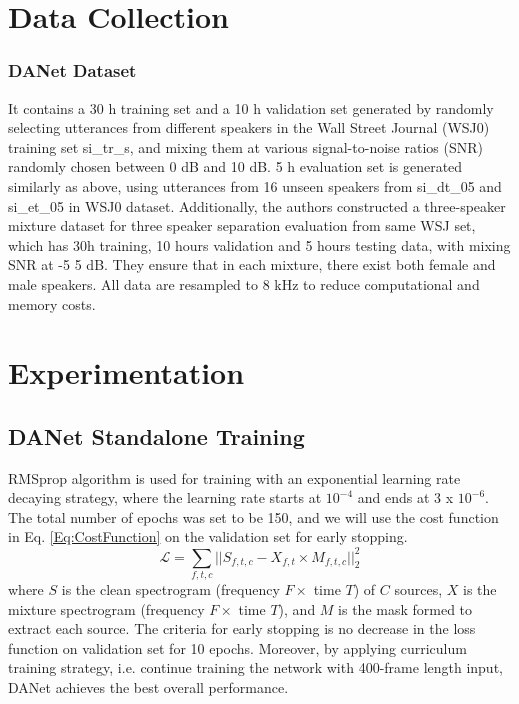 \documentclass{article}
\begin{document}
\section{Data Collection }
\label{sec:pagestyle}
\subsubsection{DANet Dataset}
It contains a 30 h training set and a 10 h validation set generated by randomly selecting utterances from
different speakers in the Wall Street Journal (WSJ0) training  set si\_tr\_s, 
and mixing them at various signal-to-noise ratios (SNR) randomly chosen between 0 dB and 10 dB. 5 h evaluation set is generated similarly as above, using utterances from 16 unseen speakers from si\_dt\_05 and si\_et\_05 in WSJ0 dataset. Additionally, the authors constructed a three-speaker mixture dataset for three speaker separation evaluation from same WSJ set, which has 30h training, 10 hours validation and 5 hours testing data, with mixing SNR at -5 5 dB. They ensure that in each mixture, there exist both female and male speakers. All data are resampled to 8 kHz to reduce computational and memory costs.

\section{Experimentation}
\label{sec:typestyle}




\subsection{DANet Standalone Training}
RMSprop algorithm is used for training with an exponential learning rate decaying strategy, where the learning rate starts at $10^{-4}$ and ends at 3 x $10^{-6}$. The total number of epochs was set to be 150, and we will use the cost function in Eq. \ref{Eq:CostFunction} on the validation set for early stopping. 
\begin{equation}
\mathcal{L}=\sum_{f,t,c} || S_{f,t,c}-X_{f,t} \times M_{f,t,c}||^2_2 \label{Eq:CostFunction}
\end{equation}
where $S$ is the clean spectrogram (frequency $F\times$ time $T$) of $C$ sources, $X$ is the mixture spectrogram (frequency $F\times$ time $T$), and $M$ is the mask formed to extract each source.
The criteria for early stopping is no decrease in the loss function on validation set for 10 epochs.  Moreover, by applying curriculum training strategy, i.e. continue training the network with 400-frame length input, DANet achieves the best overall performance.
\end{document}
